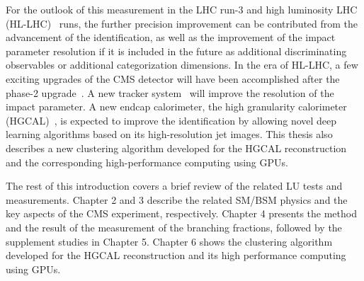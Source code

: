 \begin{table}[!h]
    \setlength{\tabcolsep}{0.5em}
    \renewcommand{\arraystretch}{1.5}
    \centering
    \caption{Standard model quantities can be derived from the measured \BWh. }
    \label{tab:introduction:derivedQuantity}
\end{table}




For the outlook of this measurement in the LHC run-3 and high luminosity LHC (HL-LHC)~\cite{Apollinari:2284929} runs, the further precision improvement can be contributed from the advancement of the \PGth identification, as well as the improvement of the impact parameter resolution if it is included in the future as additional discriminating observables or additional categorization dimensions. In the era of HL-LHC, a few exciting upgrades of the CMS detector will have been accomplished after the phase-2 upgrade~\cite{CMSCollaboration:2015zni}. A new tracker system~\cite{Klein:2017nke} will improve the resolution of the impact parameter. A new endcap calorimeter, the high granularity calorimeter (HGCAL)~\cite{Collaboration:2293646}, is expected to improve the \PGth identification by allowing novel deep learning algorithms based on its high-resolution jet images. This thesis also describes a new clustering algorithm developed for the HGCAL reconstruction and the corresponding high-performance computing using GPUs.



The rest of this introduction covers a brief review of the related LU tests and \absVcs measurements. 
Chapter 2 and 3 describe the related SM/BSM physics and the key aspects of the CMS experiment, respectively.
Chapter 4 presents the method and the result of the measurement of the \PW branching fractions, followed by the supplement studies in Chapter 5.
Chapter 6 shows the clustering algorithm developed for the HGCAL reconstruction and its high performance computing using GPUs.







